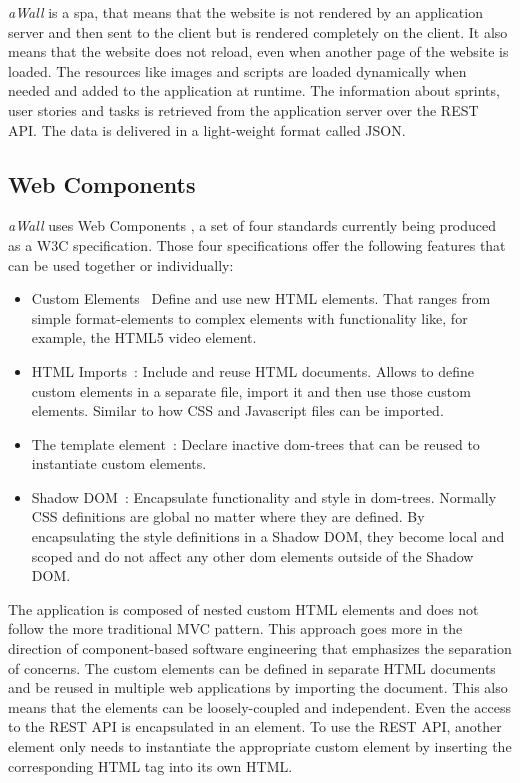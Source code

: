 \documentclass{sigchi}
\begin{document}
\textit{aWall} is a \gls{spa}, that means that the website is not rendered by an application server and then sent to the client but is rendered completely on the client.
It also means that the website does not reload, even when another page of the website is loaded. 
The resources like images and scripts are loaded dynamically when needed and added to the application at runtime.
The information about sprints, user stories and tasks is retrieved from the application server over the REST API.
The data is delivered in a light-weight format called JSON. 

\subsection{Web Components}
\textit{aWall} uses Web Components \cite{webcomponents.org}, a set of four standards currently being produced as a W3C specification.
Those four specifications offer the following features that can be used together or individually:
\begin{itemize}
	\item Custom Elements~\cite{CustomElements} Define and use new HTML elements. 
	That ranges from simple format-elements to complex elements with functionality like, for example, the HTML5 video element.
	
	\item HTML Imports~\cite{HTMLImports}: Include and reuse HTML documents.
	Allows to define custom elements in a separate file,  import it and then use those custom elements. 
	Similar to how CSS and Javascript files can be imported.
	
	\item The template element~\cite{TemplateElement}: Declare inactive \gls{dom}-trees that can be reused to instantiate custom elements.
	
	\item Shadow DOM~\cite{ShadowDOM}: Encapsulate functionality and style in \gls{dom}-trees.
	Normally CSS definitions are global no matter where they are defined.
	By encapsulating the style definitions in a Shadow DOM, they become local and scoped and do not affect any other \gls{dom} elements outside of the Shadow DOM.
\end{itemize}

The application is composed of nested custom HTML elements and does not follow the more traditional MVC pattern. 
This approach goes more in the direction of component-based software engineering that emphasizes the separation of concerns.
The custom elements can be defined in separate HTML documents and be reused in multiple web applications by importing the document.
This also means that the elements can be loosely-coupled and independent.
Even the access to the REST API is encapsulated in an element. 
To use the REST API, another element only needs to instantiate the appropriate custom element by inserting the corresponding HTML tag into its own HTML.
\end{document}
